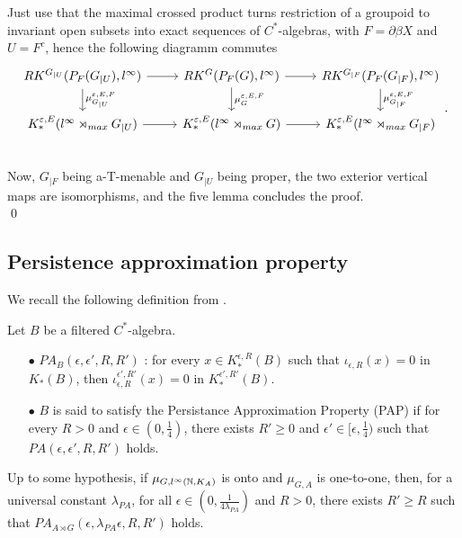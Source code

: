 \begin{dem}
Just use that the maximal crossed product turns restriction of a groupoid to invariant open subsets into exact sequences of $C^*$-algebras, with $F=\partial\beta X$ and $U= F^c$, hence the following diagramm commutes
\[\begin{tikzcd}
RK^{G_{|U}}(P_F(G_{|U}),l^\infty)\arrow{r}\arrow{d}{\mu_{G_{|U}}^{\varepsilon,E,F}} & RK^G(P_F(G),l^\infty)\arrow{r}\arrow{d}{\mu_{G}^{\varepsilon,E,F}}  & RK^{G_{|F}}(P_F(G_{|F}),l^\infty)\arrow{d}{\mu_{G_{|F}}^{\varepsilon,E,F}}  \\
K_*^{\varepsilon,E}(l^\infty \rtimes_{max} G_{|U}) \arrow{r} & K_*^{\varepsilon,E}(l^\infty \rtimes_{max} G) \arrow{r} & K_*^{\varepsilon,E}(l^\infty \rtimes_{max} G_{|F}) \\
\end{tikzcd}.\]
Now, $G_{|F}$ being a-T-menable and $G_{|U}$ being proper, the two exterior vertical maps are isomorphisms, and the five lemma concludes the proof.\\
\qed
\end{dem}

\subsection{Persistence approximation property}

We recall the following definition from \cite{OY3}.

\begin{definition}
Let $B$ be a filtered $C^*$-algebra. 
\begin{itemize}
\item[$\bullet$] $PA_B(\epsilon,\epsilon',R,R')$ : for every $x\in K_*^{\epsilon,R}(B)$ such that $\iota_{\epsilon,R}(x)=0$ in $K_*(B)$, then $\iota_{\epsilon,R}^{\epsilon',R'}(x)=0$ in $K_*^{\epsilon',R'}(B)$.
\item[$\bullet$] $B$ is said to satisfy the Persistance Approximation Property (PAP) if for every $R>0$ and $\epsilon\in (0,\frac{1}{4})$, there exists $R'\geq 0 $ and $\epsilon'\in [\epsilon,\frac{1}{4})$ such that $PA(\epsilon,\epsilon',R,R')$ holds.
\end{itemize}
\end{definition}

\begin{thm} 
Up to some hypothesis, if $\mu_{G,l^\infty(\mathbb N, K_A)}$ is onto and $\mu_{G,A}$ is one-to-one, then, for a universal constant $\lambda_{PA}$, for all $\epsilon \in(0,\frac{1}{4\lambda_{PA}})$ and $R>0$, there exists $R'\geq R$ such that $PA_{A\rtimes G}(\epsilon,\lambda_{PA}\epsilon,R,R')$ holds.
\end{thm}

